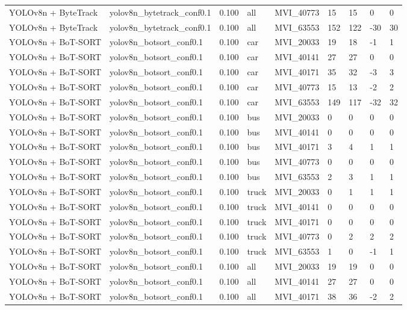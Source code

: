 \begin{tabular}{lllllllll}
YOLOv8n + ByteTrack & yolov8n\_bytetrack\_conf0.1 & 0.100 & all & MVI\_40773 & 15 & 15 & 0 & 0 \\
YOLOv8n + ByteTrack & yolov8n\_bytetrack\_conf0.1 & 0.100 & all & MVI\_63553 & 152 & 122 & -30 & 30 \\
YOLOv8n + BoT-SORT & yolov8n\_botsort\_conf0.1 & 0.100 & car & MVI\_20033 & 19 & 18 & -1 & 1 \\
YOLOv8n + BoT-SORT & yolov8n\_botsort\_conf0.1 & 0.100 & car & MVI\_40141 & 27 & 27 & 0 & 0 \\
YOLOv8n + BoT-SORT & yolov8n\_botsort\_conf0.1 & 0.100 & car & MVI\_40171 & 35 & 32 & -3 & 3 \\
YOLOv8n + BoT-SORT & yolov8n\_botsort\_conf0.1 & 0.100 & car & MVI\_40773 & 15 & 13 & -2 & 2 \\
YOLOv8n + BoT-SORT & yolov8n\_botsort\_conf0.1 & 0.100 & car & MVI\_63553 & 149 & 117 & -32 & 32 \\
YOLOv8n + BoT-SORT & yolov8n\_botsort\_conf0.1 & 0.100 & bus & MVI\_20033 & 0 & 0 & 0 & 0 \\
YOLOv8n + BoT-SORT & yolov8n\_botsort\_conf0.1 & 0.100 & bus & MVI\_40141 & 0 & 0 & 0 & 0 \\
YOLOv8n + BoT-SORT & yolov8n\_botsort\_conf0.1 & 0.100 & bus & MVI\_40171 & 3 & 4 & 1 & 1 \\
YOLOv8n + BoT-SORT & yolov8n\_botsort\_conf0.1 & 0.100 & bus & MVI\_40773 & 0 & 0 & 0 & 0 \\
YOLOv8n + BoT-SORT & yolov8n\_botsort\_conf0.1 & 0.100 & bus & MVI\_63553 & 2 & 3 & 1 & 1 \\
YOLOv8n + BoT-SORT & yolov8n\_botsort\_conf0.1 & 0.100 & truck & MVI\_20033 & 0 & 1 & 1 & 1 \\
YOLOv8n + BoT-SORT & yolov8n\_botsort\_conf0.1 & 0.100 & truck & MVI\_40141 & 0 & 0 & 0 & 0 \\
YOLOv8n + BoT-SORT & yolov8n\_botsort\_conf0.1 & 0.100 & truck & MVI\_40171 & 0 & 0 & 0 & 0 \\
YOLOv8n + BoT-SORT & yolov8n\_botsort\_conf0.1 & 0.100 & truck & MVI\_40773 & 0 & 2 & 2 & 2 \\
YOLOv8n + BoT-SORT & yolov8n\_botsort\_conf0.1 & 0.100 & truck & MVI\_63553 & 1 & 0 & -1 & 1 \\
YOLOv8n + BoT-SORT & yolov8n\_botsort\_conf0.1 & 0.100 & all & MVI\_20033 & 19 & 19 & 0 & 0 \\
YOLOv8n + BoT-SORT & yolov8n\_botsort\_conf0.1 & 0.100 & all & MVI\_40141 & 27 & 27 & 0 & 0 \\
YOLOv8n + BoT-SORT & yolov8n\_botsort\_conf0.1 & 0.100 & all & MVI\_40171 & 38 & 36 & -2 & 2 \\

\end{tabular}
